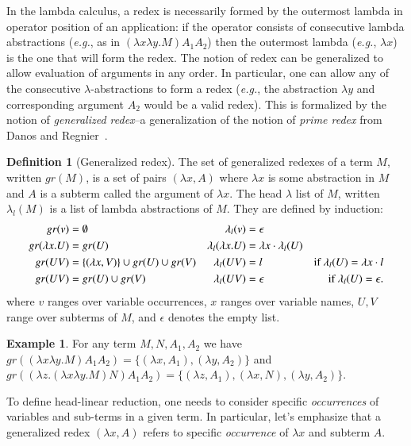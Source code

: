 \documentclass{elsarticle}
\makeatletter
\theoremstyle{plain}
\theoremstyle{definition}
\newtheorem{definition}{Definition}[section]
\newtheorem{example}{Example}[section]
\theoremstyle{remark}
\renewcommand\eg{{\it e.g.\@\xspace}}
\makeatother
\begin{document}
In the lambda calculus, a redex is necessarily formed by the outermost lambda in operator position of an application: if the operator consists of consecutive lambda abstractions (\eg, as in $(\lambda x \lambda y . M) A_1 A_2$) then the outermost lambda (\eg, $\lambda x$) is the one that will form the redex. The notion of redex can be generalized to allow evaluation of arguments in any order. In particular, one can allow any of the consecutive $\lambda$-abstractions to form a redex (\eg, the abstraction $\lambda y$ and corresponding argument $A_2$ would be a valid redex). This is formalized by the notion of \emph{generalized redex}--a generalization of the notion of \emph{prime redex} from Danos and Regnier~\cite{danos-head,REGNIER1994281}.
\begin{definition}[Generalized redex]
\label{dfn:generalized_redex}
The set of generalized redexes of a term $M$, written $gr(M)$, is a set of pairs $(\lambda x, A)$ where $\lambda x$ is some abstraction in $M$ and $A$ is a subterm called the argument of $\lambda x$. The head $\lambda$ list of $M$, written $\lambda_l(M)$ is a list of lambda abstractions of $M$. They are defined by induction:
\begin{align*}
gr(v) &= \emptyset & \lambda_l(v) &= \epsilon\\
gr(\lambda x. U) &= gr(U) & \lambda_l(\lambda x. U) &= \lambda x \cdot \lambda_l(U) \\
gr(U V) &= \{ (\lambda x, V) \} \cup gr(U) \cup gr(V) &
\lambda_l(U V) &= l & \mbox{if $\lambda_l(U) = \lambda x \cdot l$} \\
gr(U V) &= gr(U) \cup gr(V) & \lambda_l(U V) &= \epsilon & \mbox{if $\lambda_l(U) = \epsilon$.}
\end{align*}
where $v$ ranges over variable occurrences, $x$ ranges over variable names, $U, V$ range over subterms of $M$, and $\epsilon$ denotes the empty list.
\end{definition}

\begin{example} For any term $M, N, A_1, A_2$ we have
$gr((\lambda x \lambda y . M) A_1 A_2) = \{ (\lambda x, A_1), (\lambda y, A_2)\}$ and
 $gr((\lambda z . (\lambda x \lambda y . M) N) A_1 A_2) = \{ (\lambda z, A_1), (\lambda x, N), (\lambda y, A_2)\}$.
\end{example}

To define head-linear reduction, one needs to consider specific \emph{occurrences} of variables and sub-terms in a given term. In particular, let's emphasize that a generalized redex  $(\lambda x, A)$ refers to specific \emph{occurrence} of $\lambda x$ and subterm $A$.
\end{document}
